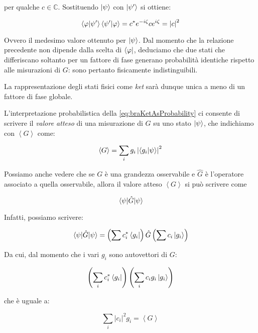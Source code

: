 per qualche $c \in \mathbb{C}$. Sostituendo $\ket{\psi}$ con $\ket{\psi '}$ si ottiene:

	\begin{equation}
		\braket{\varphi}{\psi'} \braket{\psi'}{\varphi} = c^* e^{- i \zeta} c e^{i \zeta} = \left | c \right | ^ 2
	\end{equation}

Ovvero il medesimo valore ottenuto per $\ket{\psi}$. Dal momento che la relazione precedente non dipende dalla scelta di $\bra{\varphi}$, deduciamo che due stati che differiscano soltanto per un fattore di fase generano probabilit\`a identiche rispetto alle misurazioni di $G$: sono pertanto fisicamente indistinguibili.

La rappresentazione degli stati fisici come \textit{ket} sar\`a dunque unica a meno di un fattore di fase globale.

L'interpretazione probabilistica della \eqref{eq:braKetAsProbability} ci consente di scrivere il \textit{valore atteso} di una misurazione di $G$ su uno stato $\ket{\psi}$, che indichiamo con $\left \langle G \right \rangle$ come:

	\begin{equation}
		\left \langle G \right \rangle = \sum_i g_i \left | \braket{g_i}{\psi} \right |^2
	\end{equation}

Possiamo anche vedere che se $G$ \`e una grandezza osservabile e $\hat{G}$ \`e l'operatore associato a quella osservabile, allora il valore atteso $\left \langle G \right \rangle$ si può scrivere come

	\[
		\mel{\psi}{\hat{G}}{\psi}
	\]

Infatti, possiamo scrivere:

	\begin{equation}
		\mel{\psi}{\hat{G}}{\psi} = \left ( \sum c_i^* \bra{g_i} \right ) \hat{G} \left ( \sum c_i \ket{g_i} \right )
	\end{equation}

Da cui, dal momento che i vari $g_i$ sono autovettori di $G$:

	\begin{equation}
		\left ( \sum_i c_i^* \bra{g_i} \right ) \left ( \sum_i c_i g_i \ket{g_i} \right )
	\end{equation}

che \`e uguale a:

	\begin{equation}
		\sum_i \left | c_i \right | ^2 g_i = \left \langle G \right \rangle
	\end{equation}

